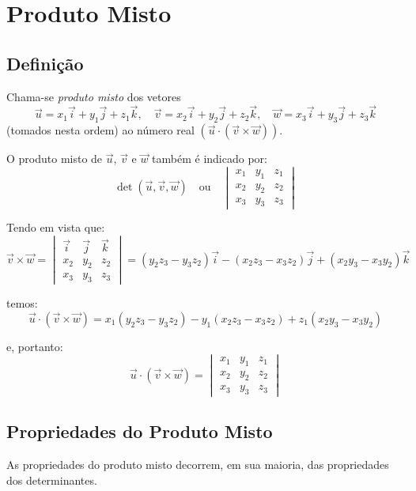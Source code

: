\section{Produto Misto}

\subsection{Definição}

Chama-se \textit{produto misto} dos vetores 
\[
  \vec{u} = x_1 \vec{i} + y_1 \vec{j} + z_1 \vec{k}, \quad
  \vec{v} = x_2 \vec{i} + y_2 \vec{j} + z_2 \vec{k}, \quad
  \vec{w} = x_3 \vec{i} + y_3 \vec{j} + z_3 \vec{k}
\]
(tomados nesta ordem) ao número real $(\vec{u} \cdot (\vec{v} \times \vec{w}))$.

O produto misto de $\vec{u}$, $\vec{v}$ e $\vec{w}$ também é indicado por:
\[
  \det(\vec{u}, \vec{v}, \vec{w}) \quad \text{ou} \quad 
  \begin{vmatrix}
    x_1 & y_1 & z_1 \\
    x_2 & y_2 & z_2 \\
    x_3 & y_3 & z_3
  \end{vmatrix}
\]

Tendo em vista que:
\[
  \vec{v} \times \vec{w} = 
  \begin{vmatrix}
    \vec{i} & \vec{j} & \vec{k} \\
    x_2 & y_2 & z_2 \\
    x_3 & y_3 & z_3
  \end{vmatrix}
  = (y_2 z_3 - y_3 z_2)\vec{i} - (x_2 z_3 - x_3 z_2)\vec{j} + (x_2 y_3 - x_3 y_2)\vec{k}
\]

temos:
\[
  \vec{u} \cdot (\vec{v} \times \vec{w}) = 
  x_1(y_2 z_3 - y_3 z_2) - y_1(x_2 z_3 - x_3 z_2) + z_1(x_2 y_3 - x_3 y_2)
\]

e, portanto:
\[
  \vec{u} \cdot (\vec{v} \times \vec{w}) = 
  \begin{vmatrix}
    x_1 & y_1 & z_1 \\
    x_2 & y_2 & z_2 \\
    x_3 & y_3 & z_3
  \end{vmatrix}
  \tag{1}
\]

\subsection{Propriedades do Produto Misto}

As propriedades do produto misto decorrem, em sua maioria, das propriedades dos
determinantes.


